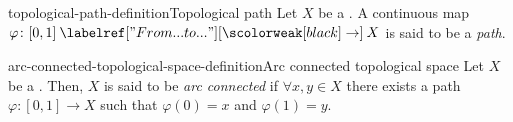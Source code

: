 \documentclass[preview]{standalone}
\begin{document}
\begin{snippetdefinition}{topological-path-definition}{Topological path}
    Let \(X\) be a \topologicalspace.
    A continuous map \(\varphi \colon [0,1] \fromto X\)
    is said to be a \emph{path}.
\end{snippetdefinition}

\begin{snippetdefinition}{arc-connected-topological-space-definition}{Arc connected topological space}
    Let \(X\) be a \topologicalspace.
    Then, \(X\) is said to be \emph{arc connected} if \(\forall x,y \in X\)
    there exists a path \(\varphi\colon [0,1] \to X\)
    such that \(\varphi(0)=x\) and \(\varphi(1)=y\).
\end{snippetdefinition}
\end{document}
